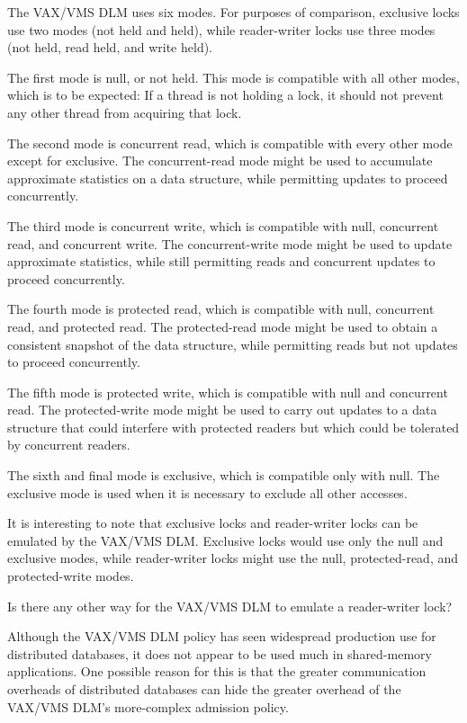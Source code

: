 The VAX/VMS DLM uses six modes.
For purposes of comparison, exclusive
locks use two modes (not held and held), while reader-writer locks
use three modes (not held, read held, and write held).

The first mode is null, or not held.
This mode is compatible with all other modes, which is to be expected:
If a thread is not holding a lock, it should not prevent any
other thread from acquiring that lock.

The second mode is concurrent read, which is compatible with every other
mode except for exclusive.
The concurrent-read mode might be used to accumulate approximate
statistics on a data structure, while permitting updates to proceed
concurrently.

The third mode is concurrent write, which is compatible with null,
concurrent read, and concurrent write.
The concurrent-write mode might be used to update approximate statistics,
while still permitting reads and concurrent updates to proceed
concurrently.

The fourth mode is protected read, which is compatible with null,
concurrent read, and protected read.
The protected-read mode might be used to obtain a consistent snapshot
of the data structure, while permitting reads but not updates to
proceed concurrently.

The fifth mode is protected write, which is compatible with null and
concurrent read.
The protected-write mode might be used to carry out updates to a data
structure that could interfere with protected readers but which could
be tolerated by concurrent readers.

The sixth and final mode is exclusive, which is compatible only with null.
The exclusive mode is used when it is necessary to exclude all other accesses.

It is interesting to note that exclusive locks and reader-writer locks
can be emulated by the VAX/VMS DLM.
Exclusive locks would use only the null and exclusive modes, while
reader-writer locks might use the null, protected-read, and
protected-write modes.

\QuickQuiz{}
	Is there any other way for the VAX/VMS DLM to emulate
	a reader-writer lock?
 \QuickQuizEnd

Although the VAX/VMS DLM policy has seen widespread production use
for distributed databases, it does not appear to be used much in
shared-memory applications.
One possible reason for this is that the greater communication overheads
of distributed databases can hide the greater overhead of the
VAX/VMS DLM's more-complex admission policy.


